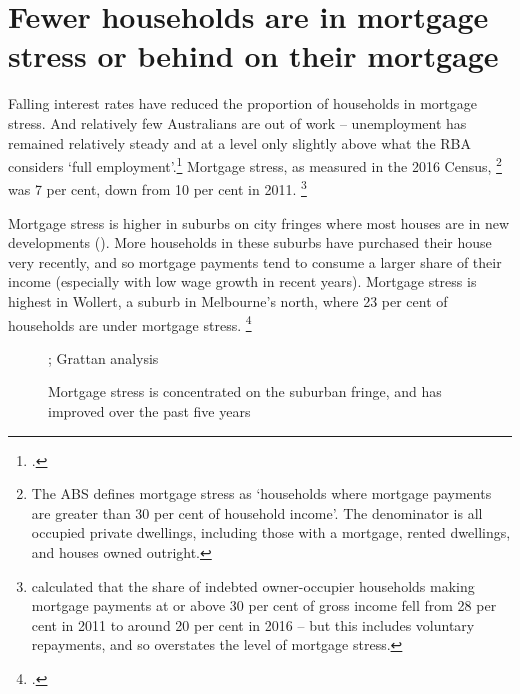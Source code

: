 \section{Fewer households are in mortgage stress or behind on their mortgage}\label{sec:fewer-households-are-in-mortgage-stress-or-behind-on-their-mortgage}

Falling interest rates have reduced the proportion of households in mortgage stress.
And relatively few Australians are out of work -- unemployment has remained relatively steady and at a level only slightly above what the RBA considers `full employment'.\footcite{Cusbert_2017_NAIRU}
Mortgage stress, as measured in the 2016 Census,%
	\footnote{The ABS defines mortgage stress as `households where mortgage payments are greater than 30 per cent of household income'.
	The denominator is all occupied private dwellings, including those with a mortgage, rented dwellings, and houses owned outright.}
was 7 per cent, down from 10 per cent in 2011.%
	\footnote{\textcite[][20]{RBAFinancialStabilityOct2017} calculated that the share of indebted owner-occupier households making mortgage payments at or above 30 per cent of gross income fell from 28 per cent in 2011 to around 20 per cent in 2016 -- but this includes voluntary repayments, and so overstates the level of mortgage stress.}

Mortgage stress is higher in suburbs on city fringes where most houses are in new developments ().
More households in these suburbs have purchased their house very recently, and so mortgage payments tend to consume a larger share of their income (especially with low wage growth in recent years).
Mortgage stress is highest in Wollert, a suburb in Melbourne's north, where 23 per cent of households are under mortgage stress.%
	\footcite{Mather2017census2016}

\begin{figure}
\caption{Mortgage stress is concentrated on the suburban fringe, and has improved over the past five years}\label{fig:mortgage-burden-sa2}
%
{\textcite{ABS20016Censuspopulationhousing}; Grattan analysis}
\end{figure}

